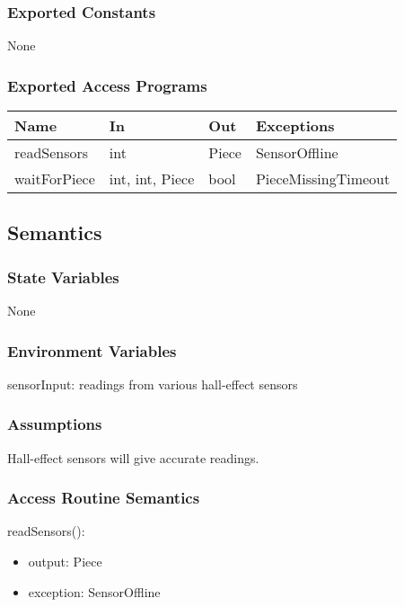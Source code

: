 \documentclass[12pt, titlepage]{article}
\begin{document}
\subsubsection{Exported Constants}{
  None
}

\subsubsection{Exported Access Programs}{
  \begin{center}
  \begin{tabular}{p{4cm} p{3cm} p{2cm} p{4cm}}
  \hline
  \textbf{Name} & \textbf{In} & \textbf{Out} & \textbf{Exceptions} \\
  \hline
  readSensors & {int} & Piece & SensorOffline \\
  \midrule
  waitForPiece & {int, int, Piece} & bool & PieceMissingTimeout \\
  \hline
  \end{tabular}
  \end{center}
}

\subsection{Semantics}

\subsubsection{State Variables}{
  None
}

\subsubsection{Environment Variables}{
  sensorInput: readings from various hall-effect sensors
}

\subsubsection{Assumptions}{
  Hall-effect sensors will give accurate readings.
}

\subsubsection{Access Routine Semantics}

\noindent readSensors():
\begin{itemize}
\item output: Piece
\item exception: SensorOffline
\end{itemize}
\end{document}
